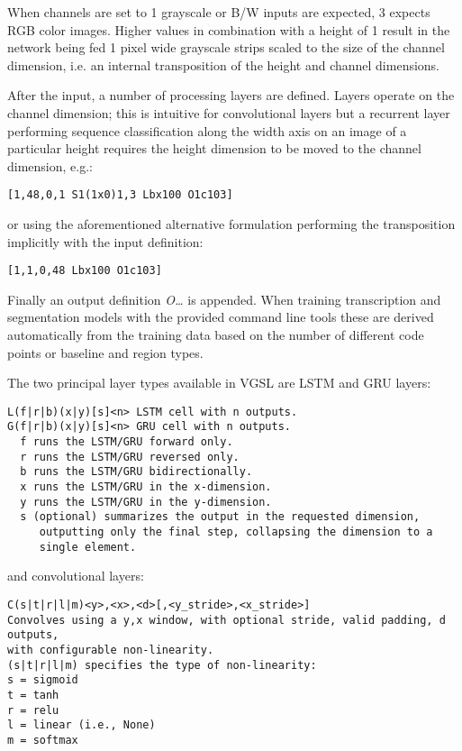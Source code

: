 When channels are set to 1 grayscale or B/W inputs are expected, 3 expects RGB
color images. Higher values in combination with a height of 1 result in the
network being fed 1 pixel wide grayscale strips scaled to the size of the
channel dimension, i.e. an internal transposition of the height and channel
dimensions.

After the input, a number of processing layers are defined. Layers operate on
the channel dimension; this is intuitive for convolutional layers but a
recurrent layer performing sequence classification along the width axis on an
image of a particular height requires the height dimension to be moved to the
channel dimension, e.g.:

\begin{verbatim}
[1,48,0,1 S1(1x0)1,3 Lbx100 O1c103]
\end{verbatim}

or using the aforementioned alternative formulation performing the
transposition implicitly with the input definition:

\begin{verbatim}        
[1,1,0,48 Lbx100 O1c103]
\end{verbatim}

Finally an output definition \emph{O\dots} is appended. When training
transcription and segmentation models with the provided command line tools
these are derived automatically from the training data based on the number of
different code points or baseline and region types.

The two principal layer types available in VGSL are LSTM and GRU layers:

\begin{verbatim}
L(f|r|b)(x|y)[s]<n> LSTM cell with n outputs.
G(f|r|b)(x|y)[s]<n> GRU cell with n outputs.
  f runs the LSTM/GRU forward only.
  r runs the LSTM/GRU reversed only.
  b runs the LSTM/GRU bidirectionally.
  x runs the LSTM/GRU in the x-dimension.
  y runs the LSTM/GRU in the y-dimension.
  s (optional) summarizes the output in the requested dimension,
     outputting only the final step, collapsing the dimension to a
     single element.
\end{verbatim}

and convolutional layers:

\begin{verbatim}
C(s|t|r|l|m)<y>,<x>,<d>[,<y_stride>,<x_stride>]
Convolves using a y,x window, with optional stride, valid padding, d outputs,
with configurable non-linearity.
(s|t|r|l|m) specifies the type of non-linearity:
s = sigmoid
t = tanh
r = relu
l = linear (i.e., None)
m = softmax
\end{verbatim}

